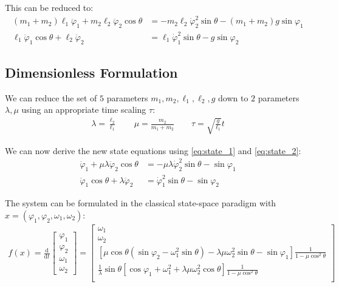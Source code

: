\documentclass[11 pt]{article}
\begin{document}
This can be reduced to:
\begin{align}
    (m_1+m_2) \ell_1 \ddot \varphi_1 + m_2 \ell_2 \ddot \varphi_2 \cos \theta &= -m_2 \ell_2 \dot \varphi_2^2 \sin \theta - (m_1+m_2) g \sin \varphi_1\label{eq:state_1}\\
    \ell_1 \ddot \varphi_1 \cos \theta + \ell_2 \ddot \varphi_2 &= \ell_1 \dot \varphi_1^2\sin{\theta} - g \sin \varphi_2\label{eq:state_2}
\end{align}

\subsection{Dimensionless Formulation}
We can reduce the set of $5$ parameters $m_1, m_2, \ell_1, \ell_2, g$ down to $2$ parameters $\lambda, \mu$ using an appropriate time scaling $\tau$:
\begin{align*}
    \lambda = \frac{\ell_2}{\ell_1} \qquad \mu  = \frac{m_2}{m_1+m_2} \qquad \tau = \sqrt{\frac{g}{\ell_1}} t
\end{align*}

We can now derive the new state equations using \eqref{eq:state_1} and \eqref{eq:state_2}:
\begin{align}
    \ddot \varphi_1 + \mu \lambda \ddot \varphi_2 \cos \theta &= - \mu \lambda \dot \varphi_2^2 \sin \theta - \sin \varphi_1\\
    \ddot \varphi_1 \cos \theta + \lambda \ddot \varphi_2 &= \dot \varphi_1^2 \sin \theta - \sin \varphi_2
\end{align}

The system can be formulated in the classical state-space paradigm with $x=(\varphi_1, \varphi_2, \omega_1, \omega_2)$:
\begin{align}
    f(x)=
    \frac{\mathrm{d}}{\mathrm{d}t}
    \begin{bmatrix}
        \varphi_1\\[2pt]
        \varphi_2\\[2pt]
        \omega_1\\[2pt]
        \omega_2
    \end{bmatrix} = 
    \begin{bmatrix}
        \omega_1\\[2pt]
        \omega_2\\[2pt]
        \left[\mu \cos \theta (\sin \varphi_2 - \omega_1^2 \sin \theta) - \lambda \mu \omega_2^2 \sin \theta - \sin \varphi_1\right]\frac{1}{1 - \mu \cos^2\theta}\\[2pt]
        \frac{1}{\lambda} \sin \theta \left[\cos \varphi_1 + \omega_1^2 + \lambda \mu \omega_2^2 \cos \theta \right]\frac{1}{1 - \mu \cos^2\theta}\\[2pt]
    \end{bmatrix}
\end{align}
\end{document}
